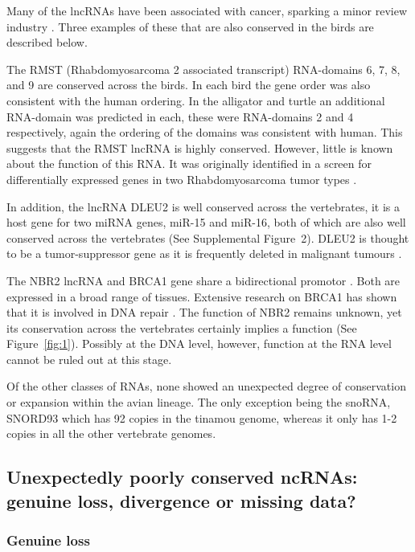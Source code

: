 \documentclass[10pt]{bmc_article}
\newenvironment{bmcformat}{\begin{raggedright}\baselineskip20pt\sloppy\setboolean{publ}{false}}{\end{raggedright}\baselineskip20pt\sloppy}
\begin{document}
\begin{bmcformat}
Many of the lncRNAs have been associated with cancer, sparking a minor
review industry \cite{Prensner:2011,Spizzo:2012}. Three examples of
these that are also conserved in the birds are described below.

The RMST (Rhabdomyosarcoma 2 associated transcript) RNA-domains 6, 7,
8, and 9 are conserved across the birds. In each bird the gene order
was also consistent with the human ordering. In the alligator and
turtle an additional RNA-domain was predicted in each, these were
RNA-domains 2 and 4 respectively, again the ordering of the domains
was consistent with human. This suggests that the RMST lncRNA is
highly conserved. However, little is known about the function of this
RNA. It was originally identified in a screen for differentially
expressed genes in two Rhabdomyosarcoma tumor types \cite{Chan:2002}.

In addition, the lncRNA DLEU2 is well conserved across the
vertebrates, it is a host gene for two miRNA genes, miR-15 and miR-16,
both of which are also well conserved across the vertebrates (See
Supplemental Figure~2). DLEU2 is thought to be a tumor-suppressor gene
as it is frequently deleted in malignant tumours
\cite{Lerner:2009,Klein:2010}.

The NBR2 lncRNA and BRCA1 gene share a bidirectional promotor
\cite{Xu:1997}. Both are expressed in a broad range of
tissues. Extensive research on BRCA1 has shown that it is involved in
DNA repair \cite{Moynahan:1999}. The function of NBR2 remains unknown,
yet its conservation across the vertebrates certainly implies a
function (See Figure~\ref{fig:1}). Possibly at the DNA level, however,
function at the RNA level cannot be ruled out at this stage.

Of the other classes of RNAs, none showed an unexpected degree of
conservation or expansion within the avian lineage. The only exception
being the snoRNA, SNORD93 which has 92 copies in the tinamou
genome, whereas it only has 1-2 copies in all the other vertebrate
genomes. 

\subsection*{Unexpectedly poorly conserved  ncRNAs: genuine loss, divergence or missing  data?}

\subsubsection*{Genuine loss}


\end{bmcformat}
\end{document}
